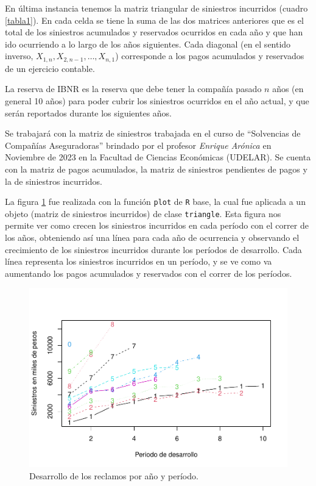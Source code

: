 \documentclass[
  12pt,
]{article}
\begin{document}
En última instancia tenemos la matriz triangular de siniestros
incurridos (cuadro \ref{tabla1}). En cada celda se tiene la suma de las
dos matrices anteriores que es el total de los siniestros acumulados y
reservados ocurridos en cada año y que han ido ocurriendo a lo largo de
los años siguientes. Cada diagonal (en el sentido inverso,
\(X_{1,n}, X_{2,n-1}, \ldots , X_{n,1}\)) corresponde a los pagos
acumulados y reservados de un ejercicio contable.

La reserva de IBNR es la reserva que debe tener la compañía pasado \(n\)
años (en general 10 años) para poder cubrir los siniestros ocurridos en
el año actual, y que serán reportados durante los siguientes años.

Se trabajará con la matriz de siniestros trabajada en el curso de
``Solvencias de Compañías Aseguradoras'' brindado por el profesor
\textit{Enrique Arónica} en Noviembre de 2023 en la Facultad de Ciencias
Económicas (UDELAR). Se cuenta con la matriz de pagos acumulados, la
matriz de siniestros pendientes de pagos y la de siniestros incurridos.

La figura \ref{triangle} fue realizada con la función \texttt{plot} de
\texttt{R} base, la cual fue aplicada a un objeto (matriz de siniestros
incurridos) de clase \texttt{triangle}. Esta figura nos permite ver como
crecen los siniestros incurridos en cada período con el correr de los
años, obteniendo así una línea para cada año de ocurrencia y observando
el crecimiento de los siniestros incurridos durante los períodos de
desarrollo. Cada línea representa los siniestros incurridos en un
período, y se ve como va aumentando los pagos acumulados y reservados
con el correr de los períodos.

\begin{figure}
\centering
\includegraphics{informe_files/figure-latex/unnamed-chunk-4-1.pdf}
\caption{\label{triangle} Desarrollo de los reclamos por año y período.}
\end{figure}
\end{document}
